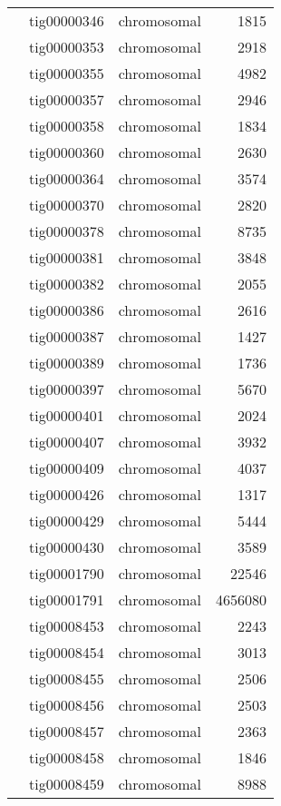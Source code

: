 {\begin{supertabular}{llcr}
         & tig00000346 & chromosomal & 1815 \\
         & tig00000353 & chromosomal & 2918 \\
         & tig00000355 & chromosomal & 4982 \\
         & tig00000357 & chromosomal & 2946 \\
         & tig00000358 & chromosomal & 1834 \\
         & tig00000360 & chromosomal & 2630 \\
         & tig00000364 & chromosomal & 3574 \\
         & tig00000370 & chromosomal & 2820 \\
         & tig00000378 & chromosomal & 8735 \\
         & tig00000381 & chromosomal & 3848 \\
         & tig00000382 & chromosomal & 2055 \\
         & tig00000386 & chromosomal & 2616 \\
         & tig00000387 & chromosomal & 1427 \\
         & tig00000389 & chromosomal & 1736 \\
         & tig00000397 & chromosomal & 5670 \\
         & tig00000401 & chromosomal & 2024 \\
         & tig00000407 & chromosomal & 3932 \\
         & tig00000409 & chromosomal & 4037 \\
         & tig00000426 & chromosomal & 1317 \\
         & tig00000429 & chromosomal & 5444 \\
         & tig00000430 & chromosomal & 3589 \\
         & tig00001790 & chromosomal & 22546 \\
         & tig00001791 & chromosomal & 4656080 \\
         & tig00008453 & chromosomal & 2243 \\
         & tig00008454 & chromosomal & 3013 \\
         & tig00008455 & chromosomal & 2506 \\
         & tig00008456 & chromosomal & 2503 \\
         & tig00008457 & chromosomal & 2363 \\
         & tig00008458 & chromosomal & 1846 \\
         & tig00008459 & chromosomal & 8988 \\

\end{supertabular}}
